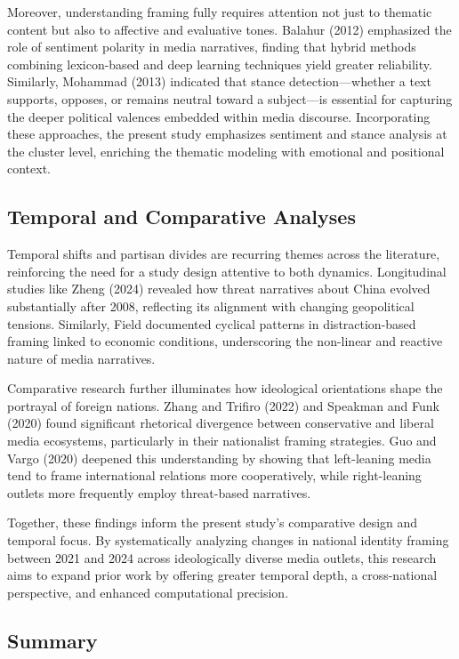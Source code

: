\documentclass[12pt]{article}
\begin{document}
Moreover, understanding framing fully requires attention not just to thematic content but also to affective and evaluative tones. Balahur (2012) emphasized the role of sentiment polarity in media narratives, finding that hybrid methods combining lexicon-based and deep learning techniques yield greater reliability. Similarly, Mohammad (2013) indicated that stance detection—whether a text supports, opposes, or remains neutral toward a subject—is essential for capturing the deeper political valences embedded within media discourse. Incorporating these approaches, the present study emphasizes sentiment and stance analysis at the cluster level, enriching the thematic modeling with emotional and positional context.

\subsection*{Temporal and Comparative Analyses}

Temporal shifts and partisan divides are recurring themes across the literature, reinforcing the need for a study design attentive to both dynamics. Longitudinal studies like Zheng (2024) revealed how threat narratives about China evolved substantially after 2008, reflecting its alignment with changing geopolitical tensions. Similarly, Field documented cyclical patterns in distraction-based framing linked to economic conditions, underscoring the non-linear and reactive nature of media narratives.

Comparative research further illuminates how ideological orientations shape the portrayal of foreign nations. Zhang and Trifiro (2022) and Speakman and Funk (2020) found significant rhetorical divergence between conservative and liberal media ecosystems, particularly in their nationalist framing strategies. Guo and Vargo (2020) deepened this understanding by showing that left-leaning media tend to frame international relations more cooperatively, while right-leaning outlets more frequently employ threat-based narratives.

Together, these findings inform the present study’s comparative design and temporal focus. By systematically analyzing changes in national identity framing between 2021 and 2024 across ideologically diverse media outlets, this research aims to expand prior work by offering greater temporal depth, a cross-national perspective, and enhanced computational precision.

\subsection*{Summary}
\end{document}
